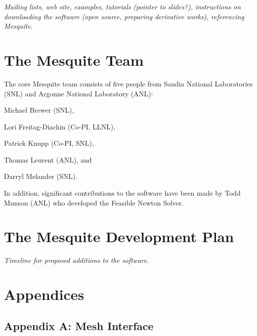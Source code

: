 \documentclass[letter]{report}
\begin{document}
{\it Mailing lists, web site, examples, tutorials (pointer to slides?), 
instructions on downloading the software (open source, preparing 
derivative works), referencing Mesquite.}

\chapter{The Mesquite Team}

The core Mesquite team consists of five people from Sandia
National Laboratories (SNL) and Argonne National Laboratory (ANL): \newline

Michael Brewer (SNL), \newline

Lori Freitag-Diachin (Co-PI, LLNL), \newline

Patrick Knupp (Co-PI, SNL),\newline

Thomas Leurent (ANL), and \newline

Darryl Melander (SNL).  \newline

\noindent In addition,
significant contributions to the software have been made by
Todd Munson (ANL) who developed the Feasible Newton Solver.

\chapter{The Mesquite Development Plan}

{\it Timeline for proposed additions to the software.}



\chapter{Appendices}

\section{Appendix A: Mesh Interface}
\label{append_mesh}

\newcommand{\entrylabel}[1]{
   {\parbox[b]{\labelwidth-4pt}{\makebox[0pt][l]{\textbf{#1}}\\}}}
\newenvironment{Desc}
{\begin{list}{}
  {
    \settowidth{\labelwidth}{40pt}
    \setlength{\leftmargin}{\labelwidth}
    \setlength{\parsep}{0pt}
    \setlength{\itemsep}{-4pt}
    \renewcommand{\makelabel}{\entrylabel}
  }
}
{\end{list}}
\end{document}
